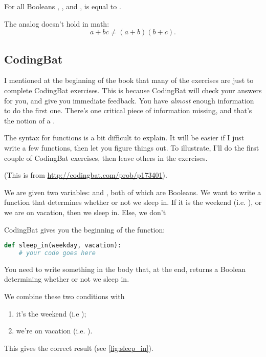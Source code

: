 \begin{lemma}
  For all Booleans , , and ,  is equal to .
\end{lemma}

The analog doesn't hold in math: $$a + bc \ne (a + b)(b + c).$$

\subsection{CodingBat}

I mentioned at the beginning of the book that many of the exercises
are just to complete CodingBat exercises. This is because CodingBat
will check your answers for you, and give you immediate feedback. You
have \emph{almost} enough information to do the first one. There's one
critical piece of information missing, and that's the notion of a
.

The syntax for functions is a bit difficult to explain. It will be
easier if I just write a few functions, then let you figure things
out.  To illustrate, I'll do the first couple of CodingBat exercises,
then leave others in the exercises.

\begin{example}
  (This is from \url{http://codingbat.com/prob/p173401}).

  We are given two variables:  and , both
  of which are Booleans. We want to write a function that determines
  whether or not we sleep in. If it is the weekend (i.e. ), or we are on vacation, then we sleep in. Else, we don't

  \begin{solution}
    CodingBat gives you the beginning of the function:

\begin{lstlisting}[language=Python]
def sleep_in(weekday, vacation):
    # your code goes here
\end{lstlisting}
    You need to write something in the body that, at the end, returns
    a Boolean determining whether or not we sleep in.

    We combine these two conditions with 

    \begin{enumerate}
    \item it's the weekend (i.e );
    \item we're on vacation (i.e. ).
    \end{enumerate}


    This gives the correct result (see \cref{fig:sleep_in}).
  \end{solution}
\end{example}

